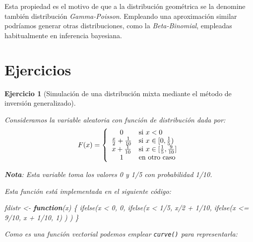 \documentclass[
  10pt,
]{book}
\newenvironment{Shaded}{\begin{snugshade}}{\end{snugshade}}
\newcommand{\ControlFlowTok}[1]{\textcolor[rgb]{0.13,0.29,0.53}{\textbf{#1}}}
\newcommand{\DecValTok}[1]{\textcolor[rgb]{0.00,0.00,0.81}{#1}}
\newcommand{\FunctionTok}[1]{\textcolor[rgb]{0.00,0.00,0.00}{#1}}
\newcommand{\NormalTok}[1]{#1}
\newcommand{\OtherTok}[1]{\textcolor[rgb]{0.56,0.35,0.01}{#1}}
\newcommand{\SpecialCharTok}[1]{\textcolor[rgb]{0.00,0.00,0.00}{#1}}
\theoremstyle{break}
\newtheorem{exercise}{Ejercicio}[chapter]
\theoremstyle{nonumberplain}
\begin{document}
Esta propiedad es el motivo de que a la distribución geométrica se la denomine también distribución \emph{Gamma-Poisson}.
Empleando una aproximación similar podríamos generar otras distribuciones, como la \emph{Beta-Binomial}, empleadas habitualmente en inferencia bayesiana.

\hypertarget{ejercicios-discretas}{%
\section{Ejercicios}\label{ejercicios-discretas}}

\begin{exercise}[Simulación de una distribución mixta mediante el método de inversión generalizado]
\protect\hypertarget{exr:mixta-cuantil}{}\label{exr:mixta-cuantil}

Consideramos la variable aleatoria con función de distribución dada por:
\[F(x)=\left\{
\begin{array}
[c]{cl}0 & \mbox{si $x<0$}\\
\frac{x}{2}+\frac{1}{10} & \mbox{si $x\in[0,\frac{1}{5})$}\\
x+\frac{1}{10} & \mbox{si $x\in[\frac{1}{5},\frac{9}{10}]$}\\
1 & \mbox{en otro caso}
\end{array}
\right.\]

\textbf{Nota}: Esta variable toma los valores 0 y 1/5 con probabilidad 1/10.

Esta función está implementada en el siguiente código:

\begin{Shaded}
\begin{Highlighting}[]
\NormalTok{fdistr }\OtherTok{\textless{}{-}} \ControlFlowTok{function}\NormalTok{(x) \{}
\FunctionTok{ifelse}\NormalTok{(x }\SpecialCharTok{\textless{}} \DecValTok{0}\NormalTok{, }\DecValTok{0}\NormalTok{,}
    \FunctionTok{ifelse}\NormalTok{(x }\SpecialCharTok{\textless{}} \DecValTok{1}\SpecialCharTok{/}\DecValTok{5}\NormalTok{, x}\SpecialCharTok{/}\DecValTok{2} \SpecialCharTok{+} \DecValTok{1}\SpecialCharTok{/}\DecValTok{10}\NormalTok{,}
        \FunctionTok{ifelse}\NormalTok{(x }\SpecialCharTok{\textless{}=} \DecValTok{9}\SpecialCharTok{/}\DecValTok{10}\NormalTok{, x }\SpecialCharTok{+} \DecValTok{1}\SpecialCharTok{/}\DecValTok{10}\NormalTok{, }\DecValTok{1}\NormalTok{) ) )}
\NormalTok{\}}
\end{Highlighting}
\end{Shaded}

Como es una función vectorial podemos emplear \texttt{curve()} para representarla:


\end{exercise}
\end{document}

